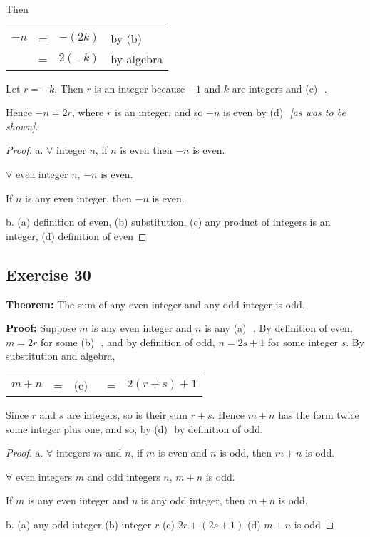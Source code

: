 \documentclass[14pt]{extarticle}
\newcommand{\fbl}{\underline{\hspace{1cm}}\,\,}
\newcommand{\fa}{\forall}
\begin{document}
Then

\begin{center}
\begin{tabular}{rcll}
$-n$ & = & $-(2k)$ & \color{cyan} by (b) \fbl \\
& = & $2(-k)$ & \color{cyan} by algebra \\
\end{tabular}
\end{center}

Let $r = -k$. Then $r$ is an integer because $-1$ and $k$ are integers and {\color{cyan}(c)} \fbl. 

Hence $-n = 2r$, where $r$ is an integer, and so $-n$ is even by {\color{cyan}(d)} \fbl {\it [as was to be shown]}.

\begin{proof}
a. $\fa$ integer $n$, if $n$ is even then $-n$ is even.

$\fa$ even integer $n$, $-n$ is even.

If $n$ is any even integer, then $-n$ is even.

b. (a) definition of even, (b) substitution, (c) any product of integers is an integer, (d) definition of even
\end{proof}

\subsection{Exercise 30}
{\bf Theorem:} The sum of any even integer and any odd integer is odd.

{\bf Proof:} Suppose $m$ is any even integer and $n$ is any {\color{cyan}(a)} \fbl. By definition of even, $m = 2r$ for some {\color{cyan}(b)} \fbl, and by definition of odd, $n = 2s + 1$ for some integer $s$. By substitution and algebra,

\begin{center}
\begin{tabular}{ccccc}
$m+n$ & = & {\color{cyan}(c)} \fbl & = & $2(r+s)+1$ \\
\end{tabular}
\end{center}

Since $r$ and $s$ are integers, so is their sum $r+s$. Hence $m+n$ has the form twice some integer plus one, and so, by {\color{cyan}(d)} \fbl by definition of odd.

\begin{proof}
a. $\fa$ integers $m$ and $n$, if $m$ is even and $n$ is odd, then $m + n$ is odd.

$\fa$ even integers $m$ and odd integers $n$, $m + n$ is odd.

If $m$ is any even integer and $n$ is any odd integer,
then $m + n$ is odd.

b. (a) any odd integer (b) integer $r$ (c) $2r + (2s + 1)$ (d) $m + n$ is odd
\end{proof}
\end{document}
